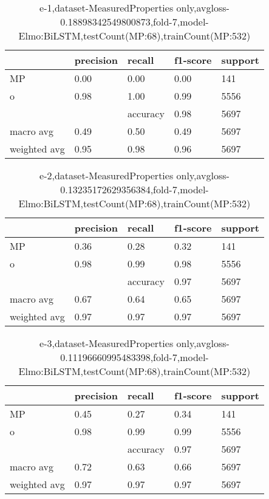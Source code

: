 \begin{table}[!ht] 
\centering
\caption{e-1,dataset-MeasuredProperties only,avgloss-0.18898342549800873,fold-7,model-Elmo:BiLSTM,testCount(MP:68),trainCount(MP:532)}\label{e-1data-mpS.tsv}
\begin{tabularx}{300pt}{|X|X|X|X|X|}
\hline
&precision&recall&f1-score&support\\
\hline
MP&0.00&0.00&0.00&141\\
\hline
o&0.98&1.00&0.99&5556\\
\hline
&&accuracy&0.98&5697\\
\hline
macro avg&0.49&0.50&0.49&5697\\
\hline
weighted avg&0.95&0.98&0.96&5697\\
\hline
\end{tabularx}
\end{table}
\begin{table}[!ht] 
\centering
\caption{e-2,dataset-MeasuredProperties only,avgloss-0.13235172629356384,fold-7,model-Elmo:BiLSTM,testCount(MP:68),trainCount(MP:532)}\label{e-2data-mpS.tsv}
\begin{tabularx}{300pt}{|X|X|X|X|X|}
\hline
&precision&recall&f1-score&support\\
\hline
MP&0.36&0.28&0.32&141\\
\hline
o&0.98&0.99&0.98&5556\\
\hline
&&accuracy&0.97&5697\\
\hline
macro avg&0.67&0.64&0.65&5697\\
\hline
weighted avg&0.97&0.97&0.97&5697\\
\hline
\end{tabularx}
\end{table}
\begin{table}[!ht] 
\centering
\caption{e-3,dataset-MeasuredProperties only,avgloss-0.11196660995483398,fold-7,model-Elmo:BiLSTM,testCount(MP:68),trainCount(MP:532)}\label{e-3data-mpS.tsv}
\begin{tabularx}{300pt}{|X|X|X|X|X|}
\hline
&precision&recall&f1-score&support\\
\hline
MP&0.45&0.27&0.34&141\\
\hline
o&0.98&0.99&0.99&5556\\
\hline
&&accuracy&0.97&5697\\
\hline
macro avg&0.72&0.63&0.66&5697\\
\hline
weighted avg&0.97&0.97&0.97&5697\\
\hline
\end{tabularx}
\end{table}
